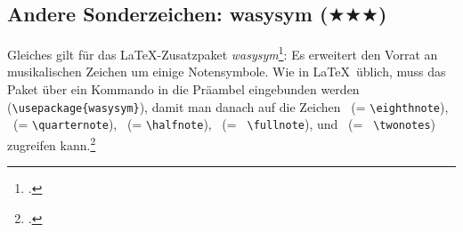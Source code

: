 %
%
%



\subsection{Andere Sonderzeichen: wasysym ($\bigstar\bigstar\bigstar$)}

Gleiches gilt für das \LaTeX-Zusatzpaket \textit{wasysym}\footcite[vgl.][\nopage
wp]{CtanWasysym2018a}: Es erweitert den Vorrat an musikalischen Zeichen um
einige Notensymbole. Wie in \LaTeX\ üblich, muss das Paket über ein Kommando in
die Präambel eingebunden werden
(\texttt{\textbackslash{usepackage\{wasysym\}}}), damit man danach auf die
Zeichen \eighthnote \ (= \texttt{\small \textbackslash{eighthnote}}),
\quarternote \ (= \texttt{\small \textbackslash{quarternote}}), \halfnote \ (=
\texttt{\small \textbackslash{halfnote}}), \fullnote \ (= \texttt{\small
\textbackslash{fullnote}}), und \twonotes \ (= \texttt{\small
\textbackslash{twonotes}}) zugreifen kann.\footcite[vgl.][2]{Kielhorn2003a}

